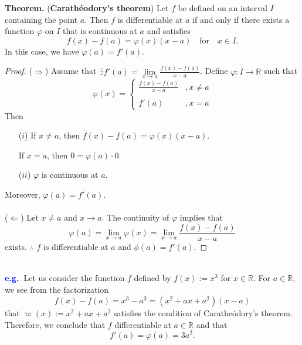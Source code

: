 \documentclass[12pt,a4paper]{article}
\newcommand{\dispsty}{\displaystyle}
\newcommand{\eg}{\textcolor{blue}{\bf e.g.\ \quad }}
\begin{document}
\begin{tcolorbox}[colback=white]
	\textbf{Theorem.} (\textbf{Carath\'eodory's theorem}) Let $f$ be defined on an interval $I$ containing the point $a$. Then $f$ is differentiable at $a$ if and only if there exists a function $\varphi$ on $I$ that is continuous at $a$ and satisfies \[
	f(x)-f(a)=\varphi(x)(x-a)\quad\text{for}\quad x\in I.
	\] In this case, we have $\varphi(a)=f'(a)$.\tcblower\begin{proof}
		($\Rightarrow$) Assume that $\exists f'(a)=\lim\limits_{x\to a}\dispsty\frac{f(x)-f(a)}{x-a}$. Define $\varphi:I\to\mathbb{R}$ such that \[
		\varphi(x)=\begin{cases}
		\dispsty\frac{f(x)-f(a)}{x-a} &, x\neq a \\
		\\
		f'(a) &, x=a
		\end{cases}
		\] Then \begin{itemize}
			\item[($i$)] If $x\neq a$, then $f(x)-f(a)=\varphi(x)(x-a)$. \par
			If $x=a$, then $0=\varphi(a)\cdot 0$.
			\item[($ii$)] $\varphi$ is continuous at $a$.
		\end{itemize} Moreover, $\varphi(a)=f'(a)$. \\
	\\
	($\Leftarrow$) Let $x\neq a$ and $x\to a$. The continuity of $\varphi$ implies that \[
	\varphi(a)=\lim\limits_{x\to a}\varphi(x)=\lim\limits_{x\to a}\frac{f(x)-f(a)}{x-a}
	\] exists. $\therefore$ $f$ is differentiable at $a$ and $\phi(a)=f'(a)$.
	\end{proof}
\end{tcolorbox}\
\\
\eg Let us consider the function $f$ defined by $f(x):=x^3$ for $x\in\mathbb{R}$. For $a\in\mathbb{R}$, we see from the factorization \[
f(x)-f(a)=x^3-a^3=(x^2+ax+a^2)(x-a)
\] that $\varpi(x):=x^2+ax+a^2$ satisfies the condition of Carathe\'odory's theorem. Therefore, we conclude that $f$ differentiable at $a\in\mathbb{R}$ and that \[
f'(a)=\varphi(a)=3a^2.
\]
\
\end{document}
